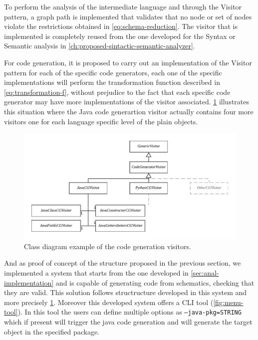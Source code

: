 To perform the analysis of the intermediate language and through the Visitor pattern,
a graph path is implemented that validates that no node or set of nodes
violate the restrictions obtained in \cref{eq:schema-reduction}. The visitor that is implemented is
completely reused from the one developed for the Syntax or Semantic analysis in \cref{ch:proposed-sintactic-semantic-analyzer}.

For code generation, it is proposed to carry out an implementation of the Visitor pattern for each of the specific code generators,
each one of the specific implementations will perform the transformation function described in \cref{eq:transformation-f},
without prejudice to the fact that each specific code generator may have more implementations of the visitor associated.
\cref{fig:class-diagram-cg} illustrates this situation where the Java code generartion visitor actually contains four more visitors
one for each language specific level of the plain objects.

\begin{figure}
    \includegraphics[width=\textwidth]{images/class-diagra-cg.pdf}
    \centering
	\caption[Class diagram example of the code generation visitors]{Class diagram example of the code generation visitors.}
    \label{fig:class-diagram-cg}
\end{figure}

And as proof of concept of the structure proposed in the previous section, we implemented a system that starts from the one
developed in \cref{sec:anal-implementation} and is capable of generating code from schematics, checking that they are valid.
This solution follows structructure developed in this system and more precisely \cref{fig:class-diagram-cg}. Moreover this
developed system offers a CLI tool (\cref{fig:menu-tool}). In this tool the users can define multiple options as \texttt{--java-pkg=STRING} which if
present will trigger the java code generation and will generate the target object in the specified package.

